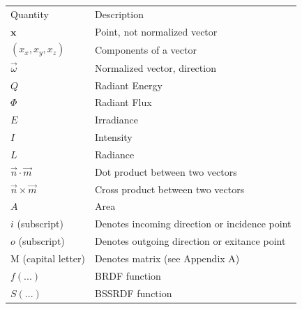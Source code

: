 \renewcommand{\arraystretch}{1.2}
\begin{table}[!ht]
\begin{tabular}{|l|l|}
\hline
Quantity                           & Description                                             \\ %
$\mathbf{x}$                       & Point, not normalized vector                            \\ %
$(x_x,x_y,x_z)$                    & Components of a vector                                  \\ %
$\vec{\omega}$                     & Normalized vector, direction                            \\ %
$Q$                                & Radiant Energy                                          \\ %
$\Phi$                             & Radiant Flux                                            \\ %
$E$                                & Irradiance                                              \\ %
$I$                                & Intensity                                               \\ %
$L$                                & Radiance                                                \\ %
$\vec{n} \cdot \vec{m}$            & Dot product between two vectors                         \\ %
$\vec{n} \times \vec{m}$           & Cross product between two vectors                       \\ %
$A$                                & Area                                                    \\ %
$i$ (subscript)                    & Denotes incoming direction or incidence point           \\ %
$o$ (subscript)                    & Denotes outgoing direction or exitance point            \\ %
M (capital letter)                 & Denotes matrix (see Appendix A)                         \\ %
$f(...)$                           & BRDF function                                           \\ %
$S(...)$                           & BSSRDF function                                         \\ %

\end{tabular}
\end{table}
